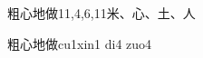 \begin{entry}{粗心地做}{11,4,6,11}{⽶、⼼、⼟、⼈}
  \begin{phonetics}{粗心地做}{cu1xin1 di4 zuo4}
  \end{phonetics}
\end{entry}
